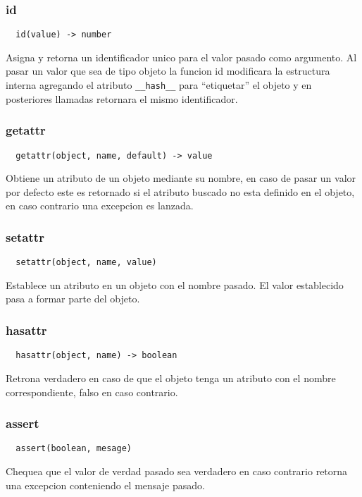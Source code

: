\subsubsection*{id}
\begin{verbatim}
  id(value) -> number
\end{verbatim}
Asigna y retorna un identificador unico para el valor pasado como argumento.
Al pasar un valor que sea de tipo objeto la funcion id modificara la
estructura interna agregando el atributo \verb|__hash__| para ``etiquetar''
el objeto y en posteriores llamadas retornara el mismo identificador.

\subsubsection*{getattr}
\begin{verbatim}
  getattr(object, name, default) -> value
\end{verbatim}
Obtiene un atributo de un objeto mediante su nombre, en caso de pasar un valor
por defecto este es retornado si el atributo buscado no esta definido en el
objeto, en caso contrario una excepcion es lanzada.

\subsubsection*{setattr}
\begin{verbatim}
  setattr(object, name, value)
\end{verbatim}
Establece un atributo en un objeto con el nombre pasado. El valor establecido
pasa a formar parte del objeto.

\subsubsection*{hasattr}
\begin{verbatim}
  hasattr(object, name) -> boolean
\end{verbatim}
Retrona verdadero en caso de que el objeto tenga un atributo con el nombre
correspondiente, falso en caso contrario.

\subsubsection*{assert}
\begin{verbatim}
  assert(boolean, mesage)
\end{verbatim}
Chequea que el valor de verdad pasado sea verdadero en caso contrario retorna
una excepcion conteniendo el mensaje pasado.

